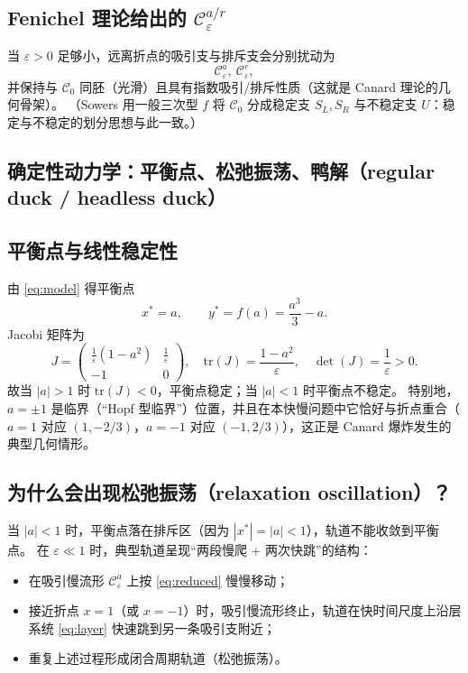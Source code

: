 \subsection{Fenichel 理论给出的 $\mathcal C_\varepsilon^{a/r}$}
当 $\varepsilon>0$ 足够小，远离折点的吸引支与排斥支会分别扰动为
\[
\mathcal C_\varepsilon^{a},\ \mathcal C_\varepsilon^{r},
\]
并保持与 $\mathcal C_0$ 同胚（光滑）且具有指数吸引/排斥性质（这就是 Canard 理论的几何骨架）。
（Sowers 用一般三次型 $f$ 将 $\mathcal C_0$ 分成稳定支 $S_L,S_R$ 与不稳定支 $U$：稳定与不稳定的划分思想与此一致。）%

\subsection{确定性动力学：平衡点、松弛振荡、鸭解（regular duck / headless duck）}

\subsection{平衡点与线性稳定性}
由 \eqref{eq:model} 得平衡点
\[
x^\ast=a,\qquad y^\ast=f(a)=\frac{a^3}{3}-a.
\]
Jacobi 矩阵为
\[
J=
\begin{pmatrix}
	\frac{1}{\varepsilon}(1-a^2) & \frac{1}{\varepsilon}\\[3pt]
	-1 & 0
\end{pmatrix},
\quad
\mathrm{tr}(J)=\frac{1-a^2}{\varepsilon},\quad
\det(J)=\frac{1}{\varepsilon}>0.
\]
故当 $|a|>1$ 时 $\mathrm{tr}(J)<0$，平衡点稳定；当 $|a|<1$ 时平衡点不稳定。
特别地，$a=\pm1$ 是临界（“Hopf 型临界”）位置，并且在本快慢问题中它恰好与折点重合（$a=1$ 对应 $(1,-2/3)$，$a=-1$ 对应 $(-1,2/3)$），这正是 Canard 爆炸发生的典型几何情形。

\subsection{为什么会出现松弛振荡（relaxation oscillation）？}
当 $|a|<1$ 时，平衡点落在排斥区（因为 $|x^\ast|=|a|<1$），轨道不能收敛到平衡点。
在 $\varepsilon\ll1$ 时，典型轨道呈现“两段慢爬 + 两次快跳”的结构：

\begin{itemize}
	\item 在吸引慢流形 $\mathcal C_\varepsilon^{a}$ 上按 \eqref{eq:reduced} 慢慢移动；
	\item 接近折点 $x=1$（或 $x=-1$）时，吸引慢流形终止，轨道在快时间尺度上沿层系统 \eqref{eq:layer} 快速跳到另一条吸引支附近；
	\item 重复上述过程形成闭合周期轨道（松弛振荡）。
\end{itemize}

